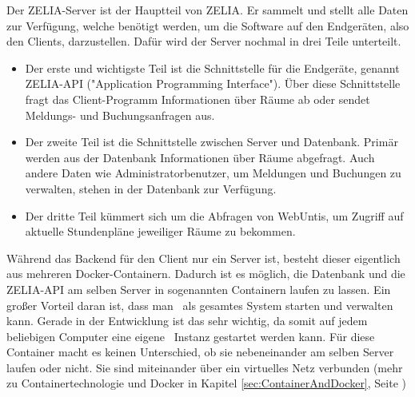 
Der ZELIA-Server ist der Hauptteil von ZELIA. Er sammelt und stellt alle Daten zur Verfügung, welche benötigt werden, um die Software auf den Endgeräten, also den Clients, darzustellen. Dafür wird der Server nochmal in drei Teile unterteilt.

\begin{itemize}
    \item Der erste und wichtigste Teil ist die Schnittstelle für die Endgeräte, genannt ZELIA-API ("Application Programming Interface"). Über diese Schnittstelle fragt das Client-Programm Informationen über Räume ab oder sendet Meldungs- und Buchungsanfragen aus.
    \item Der zweite Teil ist die Schnittstelle zwischen Server und Datenbank. Primär werden aus der Datenbank Informationen über Räume abgefragt. Auch andere Daten wie Administratorbenutzer, um Meldungen und Buchungen zu verwalten, stehen in der Datenbank zur Verfügung. 
    \item Der dritte Teil kümmert sich um die Abfragen von WebUntis, um Zugriff auf aktuelle Stundenpläne jeweiliger Räume zu bekommen.
\end{itemize}

Während das Backend für den Client nur ein Server ist, besteht dieser eigentlich aus mehreren Docker-Containern. Dadurch ist es möglich, die Datenbank und die ZELIA-API am selben Server in sogenannten Containern laufen zu lassen. Ein großer Vorteil daran ist, dass man \ZELIA\ als gesamtes System starten und verwalten kann. Gerade in der Entwicklung ist das sehr wichtig, da somit auf jedem beliebigen Computer eine eigene \ZELIA\ Instanz gestartet werden kann. Für diese Container macht es keinen Unterschied, ob sie nebeneinander am selben Server laufen oder nicht. Sie sind miteinander über ein virtuelles Netz verbunden (mehr zu Containertechnologie und Docker in Kapitel \ref{sec:ContainerAndDocker}, Seite \pageref{sec:ContainerAndDocker})

